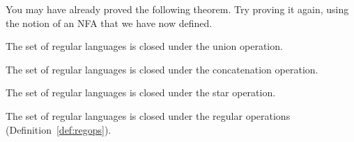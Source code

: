 \documentclass[twoside,letterpaper,openany]{book}
\begin{document}
\begin{discussion}
You may have already proved the following theorem. Try proving it again, using the notion of an NFA that we have now defined. 
\end{discussion}

\begin{thm3}
The set of regular languages is closed under the union operation.
\end{thm3}

\begin{thm3}
The set of regular languages is closed under the concatenation operation.
\end{thm3}

\begin{thm3}
The set of regular languages is closed under the star operation.
\end{thm3}

\begin{corol}
The set of regular languages is closed under the regular operations (Definition~\ref{def:regops}).
\end{corol}

\newcommand\charA{{\texttt{a}}}
\newcommand\charB{{\texttt{b}}}
\end{document}
